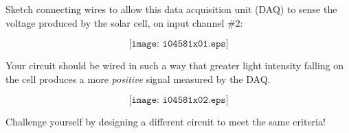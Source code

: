

Sketch connecting wires to allow this data acquisition unit (DAQ) to sense the voltage produced by the solar cell, on input channel \#2:

$$\texttt{[image: i04581x01.eps]}$$

Your circuit should be wired in such a way that greater light intensity falling on the cell produces a more {\it positive} signal measured by the DAQ.







$$\texttt{[image: i04581x02.eps]}$$

Challenge yourself by designing a different circuit to meet the same criteria! 











